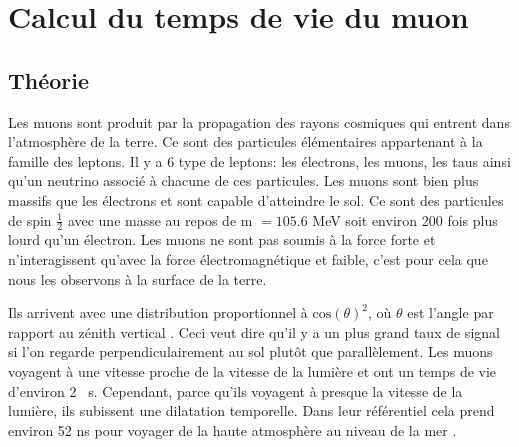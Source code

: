 \documentclass[12pt]{article}
\begin{document}
\begin{abstract}

La plupart des particules observées en dehors de notre atmosphère ont été crées par des sources galactiques, voir extra-galactiques. Si leurs énergies dépassent le  keV, celles-ci vont alors heurter la terre. La plupart des rayons cosmiques sont de nature hadronique et donc sensitif à l'interaction forte. L'atmosphère terrestre est alors un vrai champ de mine pour ces particules qui sont susceptible d'interagir à tout moment produisant des gerbes de particules neutres et chargées. Puis, à leur tour interagissent résultant en une pléthore de mésons chargées avec des temps de vie court qui éventuellement se désintègrent en énormément de muons de hautes énergies. À la surface de la terre, nous sommes bombardés par des muons de charges positive et négative avec un taux d'environ une particule par \si{\cm\squared\per\min}. Dans cette expérience, nous allons nous intéresser à  ces particules cosmiques et nous allons mesurer leurs temps de vie et leurs flux.

\end{abstract}

\newpage
\section{Calcul du temps de vie du muon}
\subsection{Théorie}

Les muons sont produit par la propagation des rayons cosmiques qui entrent dans l'atmosphère de la terre. Ce sont des particules élémentaires appartenant à la famille des leptons. Il y a 6 type de leptons: les électrons, les muons, les taus ainsi qu'un neutrino associé à chacune de ces particules. Les muons sont bien plus massifs que les électrons et sont capable d'atteindre le sol. Ce sont des particules de spin $\frac{1}{2}$ avec une masse au repos de m $=105.6$ MeV soit environ 200 fois plus lourd qu'un électron. Les muons ne sont pas soumis à la force forte et n'interagissent qu'avec la force électromagnétique et faible, c'est pour cela que nous les observons à la surface de la terre.

Ils arrivent avec une distribution proportionnel à $\text{cos}(\theta)^2$, où $\theta$ est l'angle par rapport au zénith vertical \cite{PhysRevD.98.030001}. Ceci veut dire qu'il y a un plus grand taux de signal si l'on regarde perpendiculairement au sol plutôt que parallèlement. Les muons voyagent à une vitesse proche de la vitesse de la lumière et ont un temps de vie d'environ 2 \si{\SIUnitSymbolMicro s}. Cependant, parce qu'ils voyagent à presque la vitesse de la lumière, ils subissent une dilatation temporelle. Dans leur référentiel cela prend environ 52 ns pour voyager de la haute atmosphère au niveau de la mer \cite{vest_measuring_2010}.
\end{document}
